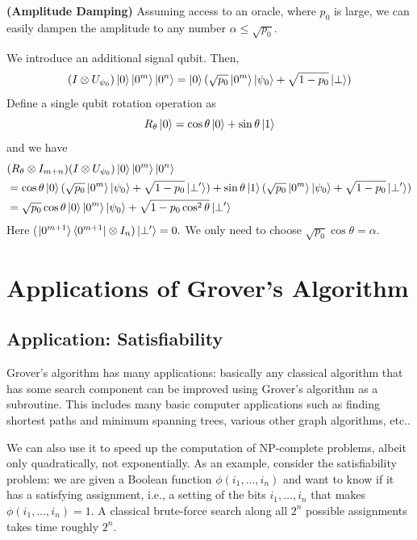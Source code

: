 \begin{example}
    \textbf{(Amplitude Damping)} Assuming access to an oracle, where $p_0$ is large, we can easily dampen the amplitude to any number $\alpha\leq \sqrt{p_0}$. 

    We introduce an additional signal qubit. Then,
    \[
    (I\otimes U_{\psi_0})\ket{0}\ket{0^m}\ket{0^n}=\ket{0}(\sqrt{p_0}\ket{0^m}\ket{\psi_0}+\sqrt{1-p_0}\ket{\perp})
    \]
    Define a single qubit rotation operation as
    \[
    R_{\theta}\ket{0}=\cos \theta\ket{0} + \sin \theta \ket{1}
    \]
    and we have
    \begin{align*}
        &(R_{\theta}\otimes I_{m+n})(I\otimes U_{\psi_0})\ket{0}\ket{0^m}\ket{0^n}\\
        &=\cos\theta \ket{0}(\sqrt{p_0}\ket{0^m}\ket{\psi_0} + \sqrt{1-p_0}\ket{\perp'})+\sin\theta\ket{1}(\sqrt{p_0}\ket{0^m}\ket{\psi_0}+\sqrt{1-p_0}\ket{\perp'})\\
        &=\sqrt{p_0}\cos\theta\ket{0}\ket{0^m}\ket{\psi_0}+\sqrt{1-p_0\cos^2\theta}\ket{\perp'}
    \end{align*}
    Here ($\ket{0^{m+1}}\bra{0^{m+1}}\otimes I_n)\ket{\perp'}=0.$ We only need to choose $\sqrt{p_0}\cos\theta=\alpha$.
\end{example}


\section{Applications of Grover's Algorithm}
\subsection{Application: Satisfiability}
Grover's algorithm has many applications: basically any classical algorithm that has some search component can be improved using Grover's algorithm as a subroutine. This includes many basic computer applications such as finding shortest paths and minimum spanning trees, various other graph algorithms, etc..

We can also use it to speed up the computation of NP-complete problems, albeit only quadratically, not exponentially. As an example, consider the satisfiability problem: we are given a Boolean function $\phi(i_1,\ldots,i_n)$ and want to know if it has a satisfying assignment, i.e., a setting of the bits $i_1,\ldots,i_n$ that makes $\phi(i_1,\ldots,i_n)=1$. A classical brute-force search along all $2^n$ possible assignments takes time roughly $2^n$.

